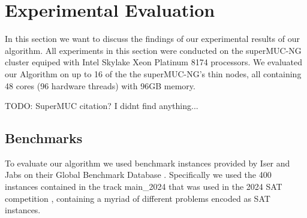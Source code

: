 \documentclass[12pt,a4paper,twoside]{scrartcl}
\numberwithin{equation}{section}
\begin{document}

\newpage
\section{Experimental Evaluation}

In this section we want to discuss the findings of our experimental results of our algorithm. All experiments in this section were conducted on the superMUC-NG cluster equiped with Intel Skylake Xeon Platinum 8174 processors. We evaluated our Algorithm on up to 16 of the the superMUC-NG's thin nodes, all containing 48 cores (96 hardware threads) with 96GB memory.

TODO: SuperMUC citation? I didnt find anything...

\subsection{Benchmarks}
To evaluate our algorithm we used benchmark instances provided by Iser and Jabs on their Global Benchmark Database \cite{benchmarkDB}. Specifically we used the 400 instances contained in the track main\_2024 that was used in the 2024 SAT competition \cite{satComp2024}, containing a myriad of different problems encoded as SAT instances.
\end{document}
